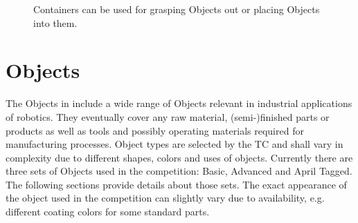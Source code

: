 \begin{figure} [h!]
	\begin{center}
		\hspace{0.05\textwidth}
	\end{center}
	\caption{Containers can be used for grasping Objects out or placing Objects into them.}
	\label{fig:containers}
\end{figure}


\section{Objects} 
\label{ssec:ManipulationObjects}

The Objects in \RCAW include a wide range of Objects relevant in industrial applications of robotics. They eventually cover any raw material, (semi-)finished parts or products as well as tools and possibly operating materials required for manufacturing processes. Object types are selected by the TC and shall vary in complexity due to different shapes, colors and uses of objects. Currently there are three sets of Objects used in the competition: Basic, Advanced and April Tagged. The following sections provide details about those sets. The exact appearance of the object used in the competition can slightly vary due to availability, e.g. different coating colors for some standard parts.



%

